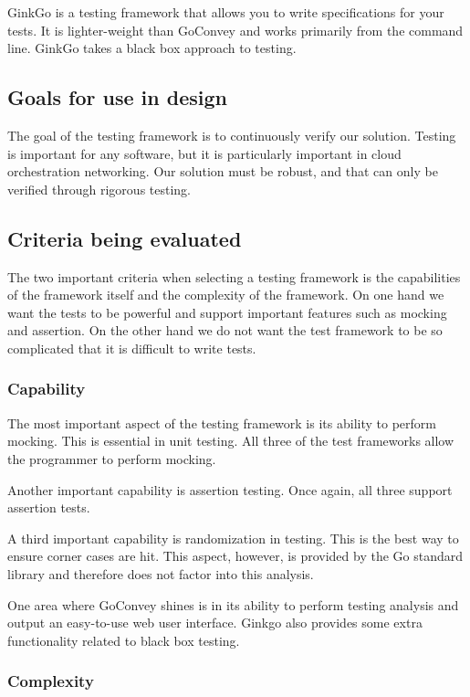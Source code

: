 \documentclass[10pt,letterpaper,onecolumn,draftclsnofoot]{IEEEtran}
\begin{document}
GinkGo is a testing framework that allows you to write specifications for your
tests. It is lighter-weight than GoConvey and works primarily from the command
line. GinkGo takes a black box approach to testing.

\subsection{Goals for use in design}

The goal of the testing framework is to continuously verify our solution.
Testing is important for any software, but it is particularly important in cloud
orchestration networking. Our solution must be robust, and that can only be
verified through rigorous testing.

\subsection{Criteria being evaluated}

The two important criteria when selecting a testing framework is the
capabilities of the framework itself and the complexity of the framework. On one
hand we want the tests to be powerful and support important features such as
mocking and assertion. On the other hand we do not want the test framework to be
so complicated that it is difficult to write tests.

\subsubsection{Capability}

The most important aspect of the testing framework is its ability to perform
mocking. This is essential in unit testing. All three of the test frameworks
allow the programmer to perform mocking.

Another important capability is assertion testing. Once again, all three support
assertion tests.

A third important capability is randomization in testing. This is the best way
to ensure corner cases are hit. This aspect, however, is provided by the Go
standard library and therefore does not factor into this analysis.

One area where GoConvey shines is in its ability to perform testing analysis and
output an easy-to-use web user interface. Ginkgo also provides some extra
functionality related to black box testing.

\subsubsection{Complexity}
\end{document}
